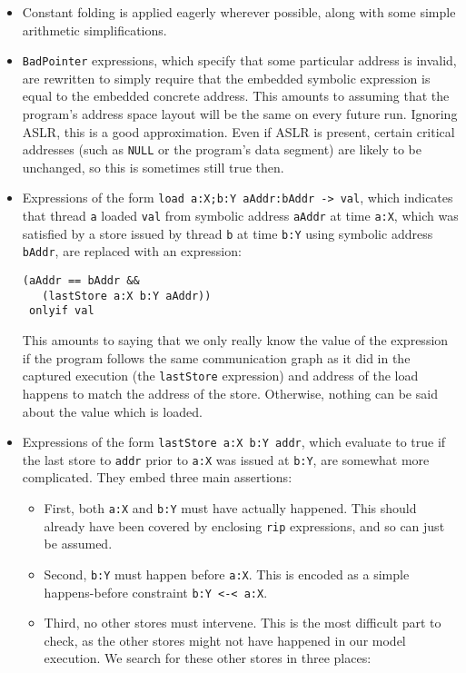 \documentclass[10pt,a4paper,twocolumn]{article}
\begin{document}
\begin{itemize}
\item Constant folding is applied eagerly wherever possible, along
  with some simple arithmetic simplifications.

\item \verb|BadPointer| expressions, which specify that some
  particular address is invalid, are rewritten to simply require that
  the embedded symbolic expression is equal to the embedded concrete
  address.  This amounts to assuming that the program's address space
  layout will be the same on every future run.  Ignoring
  ASLR\cite{Shacham2004}, this is a good approximation.  Even if ASLR
  is present, certain critical addresses (such as \verb|NULL| or the
  program's data segment) are likely to be unchanged, so this is
  sometimes still true then.

\item Expressions of the form \verb|load a:X;b:Y aAddr:bAddr -> val|,
  which indicates that thread \verb|a| loaded \verb|val| from symbolic
  address \verb|aAddr| at time \verb|a:X|, which was satisfied by a
  store issued by thread \verb|b| at time \verb|b:Y| using symbolic
  address \verb|bAddr|, are replaced with an expression:

\begin{verbatim}
(aAddr == bAddr &&
   (lastStore a:X b:Y aAddr))
 onlyif val
\end{verbatim}

  This amounts to saying that we only really know the value of the
  expression if the program follows the same communication graph as it
  did in the captured execution (the \verb|lastStore| expression) and
  address of the load happens to match the address of the store.
  Otherwise, nothing can be said about the value which is loaded.

\item Expressions of the form \verb|lastStore a:X b:Y addr|, which
  evaluate to true if the last store to \verb|addr| prior to
  \verb|a:X| was issued at \verb|b:Y|, are somewhat more complicated.
  They embed three main assertions:

  \begin{itemize}
  \item First, both \verb|a:X| and \verb|b:Y| must have actually
    happened.  This should already have been covered by enclosing
    \verb|rip| expressions, and so can just be assumed.
  \item Second, \verb|b:Y| must happen before \verb|a:X|.  This is
    encoded as a simple happens-before constraint \verb|b:Y <-< a:X|.
  \item Third, no other stores must intervene.  This is the most
    difficult part to check, as the other stores might not have
    happened in our model execution.  We search for these other stores
    in three places:


\end{itemize}
\end{itemize}
\end{document}
